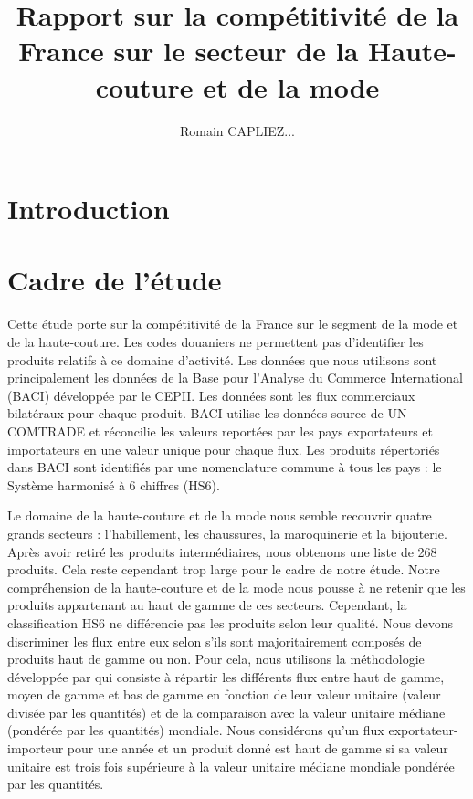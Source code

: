 \documentclass[french,10pt,a4paper]{article}
\title{Rapport sur la compétitivité de la France sur le secteur de la Haute-couture et de la mode}
\author{Romain CAPLIEZ...}
\begin{document}
\maketitle

\section{Introduction}

\newpage

\section{Cadre de l'étude}

Cette étude porte sur la compétitivité de la France sur le segment de la mode et de la haute-couture. Les codes douaniers ne permettent pas d'identifier les produits relatifs à ce domaine d'activité. Les données que nous utilisons sont principalement les données de la Base pour l'Analyse du Commerce International (BACI) \cite{Gaulier2010} développée par le CEPII. Les données sont les flux commerciaux bilatéraux pour chaque produit. BACI utilise les données source de UN COMTRADE et réconcilie les valeurs reportées par les pays exportateurs et importateurs en une valeur unique pour chaque flux. Les produits répertoriés dans BACI sont identifiés par une nomenclature commune à tous les pays : le Système harmonisé à 6 chiffres (HS6).

Le domaine de la haute-couture et de la mode nous semble recouvrir quatre grands secteurs : l'habillement, les chaussures, la maroquinerie et la bijouterie. Après avoir retiré les produits intermédiaires, nous obtenons une liste de 268 produits. Cela reste cependant trop large pour le cadre de notre étude. Notre compréhension de la haute-couture et de la mode nous pousse à ne retenir que les produits appartenant au haut de gamme de ces secteurs. Cependant, la classification HS6 ne différencie pas les produits selon leur qualité. Nous devons discriminer les flux entre eux selon s'ils sont majoritairement composés de produits haut de gamme ou non. Pour cela, nous utilisons la méthodologie développée par \cite{Fontagne1997} qui consiste à répartir les différents flux entre haut de gamme, moyen de gamme et bas de gamme en fonction de leur valeur unitaire (valeur divisée par les quantités) et de la comparaison avec la valeur unitaire médiane (pondérée par les quantités) mondiale. Nous considérons qu'un flux exportateur-importeur pour une année et un produit donné est haut de gamme si sa valeur unitaire est trois fois supérieure à la valeur unitaire médiane mondiale pondérée par les quantités.
\end{document}
